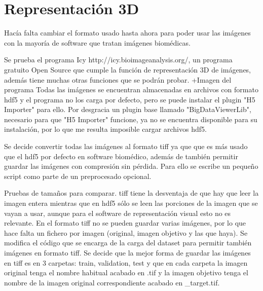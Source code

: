 \chapter{Representación 3D}

Hacía falta cambiar el formato usado hasta ahora para poder usar las imágenes con la mayoría de software que tratan imágenes biomédicas.

Se prueba el programa Icy http://icy.bioimageanalysis.org/, un programa gratuito Open Source que cumple la función de representación 3D de imágenes, además tiene muchas otras funciones que se podrán probar. +Imagen del programa
Todas las imágenes se encuentran almacenadas en archivos con formato hdf5 y el programa no los carga por defecto, pero se puede instalar el plugin "H5 Importer" para ello. Por desgracia un plugin base llamado "BigDataViewerLib", necesario para que "H5 Importer" funcione, ya no se encuentra disponible para su instalación, por lo que me resulta imposible cargar archivos hdf5.

Se decide convertir todas las imágenes al formato tiff ya que que es más usado que el hdf5 por defecto en software biomédico, además de también permitir guardar las imágenes con compresión sin pérdida. Para ello se escribe un pequeño script como parte de un preprocesado opcional.

Pruebas de tamaños para comparar. tiff tiene la desventaja de que hay que leer la imagen entera mientras que en hdf5 sólo se leen las porciones de la imagen que se vayan a usar, aunque para el software de representación visual esto no es relevante. En el formato tiff no se pueden guardar varias imágenes, por lo que hace falta un fichero por imagen (original, imagen objetivo y las que haya).
Se modifica el código que se encarga de la carga del dataset para permitir también imágenes en formato tiff. Se decide que la mejor forma de guardar las imágenes en tiff es en 3 carpetas: train, validation, test y que en cada carpeta la imagen original tenga el nombre habitual acabado en .tif y la imagen objetivo tenga el nombre de la imagen original correspondiente acabado en \_target.tif.
